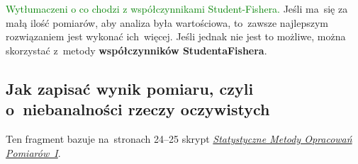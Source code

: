 \documentclass[a4paper,11pt]{article}
\newcommand{\toadd}[1]{\textcolor{green}{#1}}
\begin{document}
\toadd{Wytłumaczeni o co chodzi z współczynnikami Student-Fishera.}
Jeśli ma~się za małą ilość pomiarów, aby analiza była wartościowa,
to~zawsze najlepszym rozwiązaniem jest wykonać ich~więcej. Jeśli
jednak nie jest to możliwe, można skorzystać z~metody
\textbf{współczynników Studenta\dywiz Fishera}.





\subsection{Jak zapisać wynik pomiaru, czyli o~niebanalności rzeczy
  oczywistych}

Ten fragment bazuje na~stronach 24--25 skrypt
\href{http://users.uj.edu.pl/\~ufkamys/BK/smop1N\_h.pdf}{\emph{Statystyczne
    Metody Opracowań Pomiarów~I}}.
\end{document}
